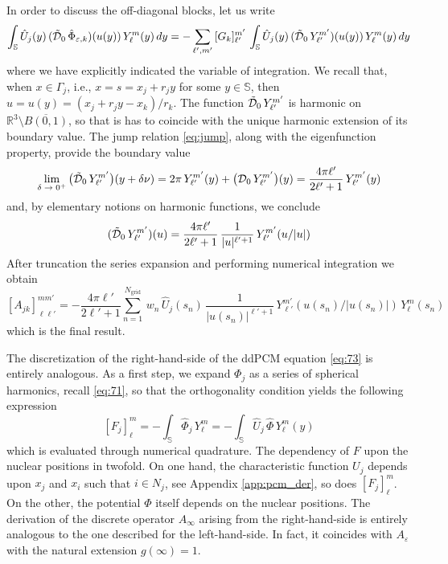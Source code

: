 In order to discuss the off-diagonal blocks, let us write
\[
 \int_{\mathbb{S}} \hat{U}_j(y) \, (\tilde{\mathcal{D}}_0 \, \hat{\Phi}_{\varepsilon,k})(u(y)) \, Y_{\ell}^{m}(y) \, dy = - \sum_{\ell',m'} \, [G_k]_{\ell'}^{m'} \,  \int_{\mathbb{S}} \hat{U}_j(y) \, (\tilde{\mathcal{D}}_0 \, Y_{\ell'}^{m'})(u(y)) \, Y_{\ell}^{m}(y) \, dy 
\]
where we have explicitly indicated the variable of integration. We recall that, when $x \in \Gamma_j$, i.e., $x = s = x_j + r_j y$ for some $y \in \mathbb{S}$, then $u = u(y) = (x_j + r_j y -x_k)/r_k$. The function $\tilde{\mathcal{D}}_0 \, Y_{\ell'}^{m'}$ is harmonic on $\mathbb{R}^3 \setminus \overline{B(0,1)}$, so that is has to coincide with the unique harmonic extension of its boundary value. The jump relation \eqref{eq:jump}, along with the eigenfunction property, provide the boundary value
\[
\lim_{\delta \; \to \; 0^+} \big(\tilde{\mathcal{D}}_0 \, Y_{\ell'}^{m'}\big)(y + \delta \nu) =  2\pi \,Y_{\ell'}^{m'}(y)+ \big( \mathcal{D}_0 \, Y_{\ell'}^{m'} \big)(y) = \frac{4 \pi \ell'}{2 \ell' + 1} \, Y_{\ell'}^{m'}(y)
\]
and, by elementary notions on harmonic functions, we conclude
\[
(\tilde{\mathcal{D}}_0 \, Y_{\ell'}^{m'})(u) = \frac{4 \pi \ell'}{2 \ell' + 1} \, \frac{1}{|u|^{\ell' + 1}} \,  Y_{\ell'}^{m'}(u/|u|)
\]
After truncation the series expansion and performing numerical integration we obtain
\begin{equation}\label{eq:ajk}
[A_{jk}]_{\ell \ell'}^{m m'} =-  \frac{4 \pi \ell'}{2 \ell' + 1}  \sum_{n=1}^{N_\text{grid}} \, w_n  \,  \hat{U}_j(s_n) \, \frac{1}{|u(s_n)|^{\ell' + 1}} \, Y_{\ell'}^{m'}(u(s_n) / |u(s_n)|) \, Y_{\ell}^{m}(s_n)
\end{equation}
which is the final result.


The discretization of the right-hand-side of the ddPCM equation \eqref{eq:73} is entirely analogous. As a first step, we expand $\Phi_j$ as a series of spherical harmonics, recall \eqref{eq:71}, so that the orthogonality condition yields the following expression
\[
[F_j]_\ell^m = - \int_{\mathbb{S}} \hat{\Phi}_j \, Y_\ell^m= - \int_{\mathbb{S}} \hat{U}_j \, \hat{\Phi} \, Y_\ell^m(y)
\]
which is evaluated through numerical quadrature. The dependency of $F$ upon the nuclear positions in twofold. On one hand, the characteristic function $U_j$ depends upon $x_j$ and $x_i$ such that $i \in N_j$, see Appendix \ref{app:pcm_der}, so does $[F_j]_\ell^m$. On the other, the potential $\Phi$ itself depends on the nuclear positions. The derivation of the discrete operator $A_\infty$ arising from the right-hand-side is entirely analogous to the one described for the left-hand-side. In fact, it coincides with $A_\varepsilon$ with the natural extension $g(\infty) = 1$.
